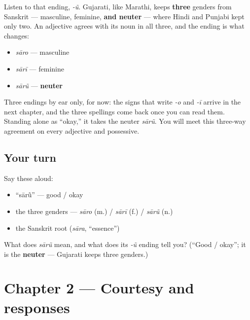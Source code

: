 \begin{grammarlens}[title={Grammar Lens: three genders, on the adjective}]
Listen to that ending, \emph{-ũ}. Gujarati, like Marathi, keeps \textbf{three} genders from Sanskrit — masculine, feminine, \textbf{and neuter} — where Hindi and Punjabi kept only two. An adjective agrees with its noun in all three, and the ending is what changes:

\begin{itemize}
\raggedright
  \item \emph{sāro} — masculine
  \item \emph{sārī} — feminine
  \item \emph{sārũ} — \textbf{neuter}
\end{itemize}

Three endings by ear only, for now: the signs that write \emph{-o} and \emph{-ī} arrive in the next chapter, and the three spellings come back once you can read them. Standing alone as \textquotedblleft{}okay,\textquotedblright{} it takes the neuter \emph{sārũ}. You will meet this three-way agreement on every adjective and possessive.
\end{grammarlens}

\subsection*{Your turn}
Say these aloud:

\begin{itemize}
\raggedright
  \item \textquotedblleft{}sārũ\textquotedblright{} — good / okay
  \item the three genders — \emph{sāro} (m.) / \emph{sārī} (f.) / \emph{sārũ} (n.)
  \item the Sanskrit root (\emph{sāra}, \textquotedblleft{}essence\textquotedblright{})
\end{itemize}

\begin{tcolorbox}[breakable,colback=teal!4,colframe=teal!35!black,title={Before you move on}]
What does \emph{sārũ} mean, and what does its \emph{-ũ} ending tell you? (\textquotedblleft{}Good / okay\textquotedblright{}; it is the \textbf{neuter} — Gujarati keeps three genders.)
\end{tcolorbox}
\section[Practice]{Chapter 2 — Courtesy and responses}


